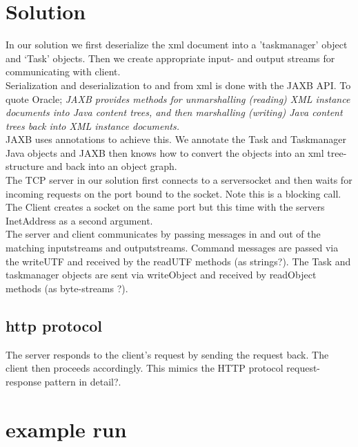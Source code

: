 \section{Solution}
\label{tcp_solution}

In our solution we first deserialize the xml document into a 'taskmanager' object and ‘Task’ objects. Then we create appropriate input- and output streams for communicating with client. \\

Serialization and deserialization to and from xml is done with the JAXB API. To quote Oracle; \textit{JAXB provides methods for unmarshalling (reading) XML instance documents into Java content trees, and then marshalling (writing) Java content trees back into XML instance documents.} \\

JAXB uses annotations to achieve this. We annotate the Task and Taskmanager  Java objects and JAXB then knows how to convert the objects into an xml tree-structure and back into an object graph.\\

The TCP server in our solution first connects to a serversocket and then waits for incoming requests on the port bound to the socket. Note this is a blocking call. The Client creates a socket on the same port but this time with the servers InetAddress as a second argument. \\

The server and client communicates by passing messages in and out of the matching inputstreams and outputstreams. Command messages are passed via the writeUTF and received by the readUTF methods (as strings?). The Task and taskmanager objects are sent via writeObject and received by readObject methods (as byte-streams ?). \\

\subsection{http protocol}

The server responds to the client’s request by sending the request back. The client then proceeds accordingly. This mimics the HTTP protocol request-response pattern in detail?.

\section{example run}
\label{tcp_example}

